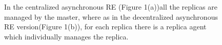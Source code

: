 \documentclass[a4paper,10pt]{article}
\begin{document}
\begin{figure}
\centering
{}
\caption{\small In the centralized asynchronous RE (Figure 1(a))all the replicas are managed by the master, where as in the decentralized asynchronous RE version(Figure 1(b)), for each replica there is a replica agent which individually manages the replica.}
\label{fig:async}
\end{figure}
\end{document}
